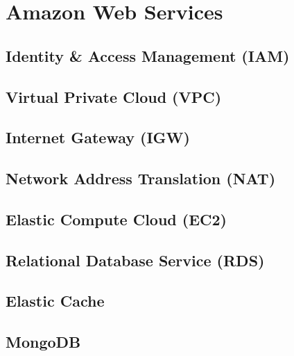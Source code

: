 
\section{Amazon Web Services}
\subsection{Identity \& Access Management (IAM)}
\subsection{Virtual Private Cloud (VPC)}
\subsection{Internet Gateway (IGW)}
\subsection{Network Address Translation (NAT)}
\subsection{Elastic Compute Cloud (EC2)}
\subsection{Relational Database Service (RDS)}
\subsection{Elastic Cache}
\subsection{MongoDB}

\pagebreak


